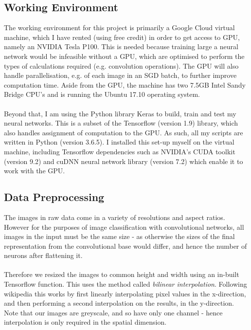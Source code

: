 \documentclass[11pt]{article} %
\theoremstyle{plain}
\theoremstyle{definition}
\begin{document}
\subsection{Working Environment}
The working environment for this project is primarily a Google Cloud virtual machine, which I have rented (using free credit) in order to get access to GPU, namely an NVIDIA Tesla P100. This is needed because training large a neural network would be infeasible without a GPU, which are optimised to perform the types of calculations required (e.g. convolution operations). The GPU will also handle parallelisation, e.g. of each image in an SGD batch, to further improve computation time. Aside from the GPU, the machine has two 7.5GB Intel Sandy Bridge CPU's and is running the Ubuntu 17.10 operating system.
\\
\\
\noindent
Beyond that, I am using the Python library Keras to build, train and test my neural networks. This is a subset of the Tensorflow (version 1.9) library, which also handles assignment of computation to the GPU. As such, all my scripts are written in Python (version 3.6.5). I installed this set-up myself on the virtual machine, including Tensorflow dependencies such as NVIDIA's CUDA toolkit (version 9.2) and cuDNN neural network library (version 7.2) which enable it to work with the GPU.

\subsection{Data Preprocessing}
The images in raw data come in a variety of resolutions and aspect ratios. However for the purposes of image classification with convolutional networks, all images in the input must be the same size - as otherwise the sizes of the final representation from the convolutional base would differ, and hence the number of neurons after flattening it. 
\\
\\
\noindent
Therefore we resized the images to common height and width using an in-built Tensorflow function. This uses the method called \textit{bilinear interpolation}. Following wikipedia \cite{wiki:bilinear_interpolation} this works by first linearly interpolating pixel values in the x-direction, and then performing a second interpolation on the results, in the y-direction. Note that our images are greyscale, and so have only one channel - hence interpolation is only required in the spatial dimension.
\\
\\
\end{document}
